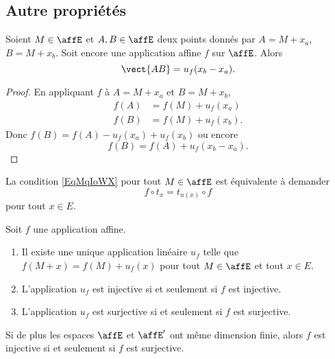 \subsection{Autre propriétés}

\begin{lemma}       \label{LEMooXXTPooKYFGGM}
    Soient \( M\in \affE\) et \( A,B\in \affE\) deux points donnés par \( A=M+x_a\), \( B=M+x_b\). Soit encore une application affine \( f\) sur \( \affE\). Alors
    \begin{equation}
        \vect{ AB }=u_f(x_b-x_a).
    \end{equation}
\end{lemma}

\begin{proof}
    En appliquant \( f\) à \( A=M+x_a\) et \( B=M+x_b\),
    \begin{subequations}
        \begin{align}
            f(A)&=f(M)+u_f(x_a)\\
            f(B)&=f(M)+u_f(x_b).
        \end{align}
    \end{subequations}
    Donc \( f(B)=f(A)-u_f(x_a)+u_f(x_b)\) ou encore
    \begin{equation}
        f(B)=f(A)+u_f(x_b-x_a).
    \end{equation}
\end{proof}

\begin{remark}
    La condition \eqref{EqMqIoWX} pour tout \( M\in\affE\) est équivalente à demander
    \begin{equation}
        f\circ t_x=t_{u(x)}\circ f
    \end{equation}
    pour tout \( x\in E\).
\end{remark}

\begin{proposition}     \label{PROPooALXYooHoMdqQ}
    Soit \( f\) une application affine.
    \begin{enumerate}
        \item       \label{ITEMooSKCYooHyRZYN}
            Il existe une unique application linéaire \( u_f\) telle que \( f(M+x)=f(M)+u_f(x)\) pour tout \( M\in \affE\) et tout \( x\in E\).
        \item
            L'application \( u_f\) est injective si et seulement si \( f\) est injective.
        \item
            L'application \( u_f\) est surjective si et seulement si \( f\) est surjective.
    \end{enumerate}
    Si de plus les espaces \( \affE\) et \( \affE'\) ont même dimension finie, alors \( f\) est injective si et seulement si \( f\) est surjective.
\end{proposition}

